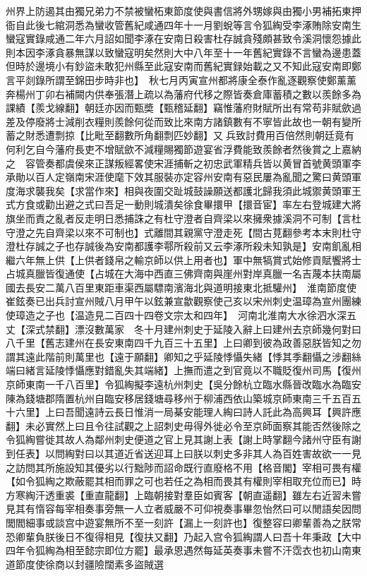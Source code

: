 州界上防遏其由獨兄弟力不禁被蠻柘東節度使與書信將外甥嫁與由獨小男補拓東押衙自此後七綰洞悉為蠻收管舊紀咸通四年十一月劉蛻等言令狐綯受李涿賄除安南生蠻寇實錄咸通二年六月詔如聞李涿在安南日殺害杜存誠貪殘頗甚致令溪洞懷怨據此則本因李涿貪暴無謀以致蠻寇明矣然則大中八年至十一年舊紀實錄不言蠻為邊患蓋但時於邊境小有鈔盜未敢犯州縣至此寇安南而舊紀實録始載之又不知此寇安南即鄭言平剡錄所謂至錦田步時非也】　秋七月丙寅宣州都將康全泰作亂逐觀察使鄭薰薰奔楊州丁卯右補闕内供奉張潛上疏以為藩府代移之際皆奏倉庫蓄積之數以羨餘多為課績【羨戈線翻】朝廷亦因而甄奬【甄稽延翻】竊惟藩府財賦所出有常苟非賦歛過差及停廢將士減削衣糧則羨餘何從而致比來南方諸鎮數有不寧皆此故也一朝有變所蓄之財悉遭剽掠【比毗至翻數所角翻剽匹妙翻】又兵致討費用百倍然則朝廷竟有何利乞自今藩府長吏不增賦歛不減糧賜獨節遊宴省浮費能致羨餘者然後賞之上嘉納之　容管奏都虞侯來正謀叛經畧使宋涯捕斬之初忠武軍精兵皆以黄冒首號黄頭軍李承勛以百人定嶺南宋涯使麾下效其服裝亦定容州安南有惡民屢為亂聞之驚曰黄頭軍度海求襲我矣【求當作來】相與夜圍交趾城鼓譟願送都護北歸我須此城禦黄頭軍王式方食或勸出避之式曰吾足一動則城潰矣徐食畢擐甲【擐音宦】率左右登城建大將旗坐而責之亂者反走明日悉捕誅之有杜守澄者自齊梁以來擁衆據溪洞不可制【言杜守澄之先自齊梁以來不可制也】式離間其親黨守澄走死【間古莧翻參考本末則杜守澄杜存誠之子也存誠後為安南都護李鄠所殺前又云李涿所殺未知孰是】安南飢亂相繼六年無上供【上供者錢帛之輸京師以供上用者也】軍中無犒賞式始修貢賦饗將士占城真臘皆復通使【占城在大海中西直三佛齊南與崖州對岸真臘一名吉蔑本扶南屬國去長安二萬八百里東距車渠西屬驃南濱海北與道明接東北抵驩州】　淮南節度使崔鉉奏已出兵討宣州賊八月甲午以鉉兼宣歙觀察使己亥以宋州刺史温璋為宣州團練使璋造之子也【温造見二百四十四卷文宗太和四年】　河南北淮南大水徐泗水深五丈【深式禁翻】漂沒數萬家　冬十月建州刺史于延陵入辭上曰建州去京師幾何對曰八千里【舊志建州在長安東南四千九百三十五里】上曰卿到彼為政善惡朕皆知之勿謂其遠此階前則萬里也【遠于願翻】卿知之乎延陵悸懾失緒【悸其季翻懾之涉翻絲端曰緒言延陵悸懾應對錯亂失其端緒】上撫而遣之到官竟以不職貶復州司馬【復州京師東南一千八百里】令狐綯擬李遠杭州刺史【吳分餘杭立臨水縣晉改臨水為臨安陳為錢塘郡隋置杭州自臨安移居錢塘尋移州于柳浦西依山築城京師東南三千五百五十六里】上曰吾聞遠詩云長日惟消一局棊安能理人綯曰詩人託此為高興耳【興許應翻】未必實然上曰且令往試觀之上詔刺史毋得外徙必令至京師面察其能否然後除之令狐綯嘗徙其故人為鄰州刺史便道之官上見其謝上表【謝上時掌翻今諸州守臣有謝到任表】以問綯對曰以其道近省送迎耳上曰朕以刺史多非其人為百姓害故欲一一見之訪問其所施設知其優劣以行黜陟而詔命既行直廢格不用【格音閣】宰相可畏有權【如令狐綯之欺蔽罷其相而罪之可也若任之為相而畏其有權則宰相取充位而已】時方寒綯汗透重裘【重直龍翻】上臨朝接對羣臣如賓客【朝直遥翻】雖左右近習未嘗見其有惰容每宰相奏事旁無一人立者威嚴不可仰視奏事畢忽怡然曰可以閒語矣因問閭閻細事或談宫中遊宴無所不至一刻許【漏上一刻許也】復整容曰卿輩善為之朕常恐卿輩負朕後日不復得相見【復扶又翻】乃起入宫令狐綯謂人曰吾十年秉政【大中四年令狐綯為相至懿宗即位方罷】最承恩遇然每延英奏事未嘗不汗霑衣也初山南東道節度使徐商以封疆險闊素多盜賊選

